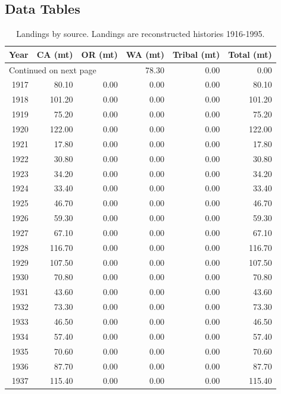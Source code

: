 \documentclass[12pt,]{article}
\begin{document}
\hypertarget{data-tables}{%
\subsection{Data Tables}\label{data-tables}}

\begin{longtable}{rrrrrr}
\caption{Landings by source.  Landings are reconstructed histories 1916-1995.} \\ 
  \hline
Year & CA (mt) & OR (mt) & WA (mt) & Tribal (mt) & Total (mt) \\ 
  \hline 
\endhead 
\hline 
\multicolumn{3}{l}{\footnotesize Continued on next page} 
\endfoot 
\endlastfoot 
 \hline
1916 & 78.30 & 0.00 & 0.00 & 0.00 & 78.30 \\ 
  1917 & 80.10 & 0.00 & 0.00 & 0.00 & 80.10 \\ 
  1918 & 101.20 & 0.00 & 0.00 & 0.00 & 101.20 \\ 
  1919 & 75.20 & 0.00 & 0.00 & 0.00 & 75.20 \\ 
  1920 & 122.00 & 0.00 & 0.00 & 0.00 & 122.00 \\ 
  1921 & 17.80 & 0.00 & 0.00 & 0.00 & 17.80 \\ 
  1922 & 30.80 & 0.00 & 0.00 & 0.00 & 30.80 \\ 
  1923 & 34.20 & 0.00 & 0.00 & 0.00 & 34.20 \\ 
  1924 & 33.40 & 0.00 & 0.00 & 0.00 & 33.40 \\ 
  1925 & 46.70 & 0.00 & 0.00 & 0.00 & 46.70 \\ 
  1926 & 59.30 & 0.00 & 0.00 & 0.00 & 59.30 \\ 
  1927 & 67.10 & 0.00 & 0.00 & 0.00 & 67.10 \\ 
  1928 & 116.70 & 0.00 & 0.00 & 0.00 & 116.70 \\ 
  1929 & 107.50 & 0.00 & 0.00 & 0.00 & 107.50 \\ 
  1930 & 70.80 & 0.00 & 0.00 & 0.00 & 70.80 \\ 
  1931 & 43.60 & 0.00 & 0.00 & 0.00 & 43.60 \\ 
  1932 & 73.30 & 0.00 & 0.00 & 0.00 & 73.30 \\ 
  1933 & 46.50 & 0.00 & 0.00 & 0.00 & 46.50 \\ 
  1934 & 57.40 & 0.00 & 0.00 & 0.00 & 57.40 \\ 
  1935 & 70.60 & 0.00 & 0.00 & 0.00 & 70.60 \\ 
  1936 & 87.70 & 0.00 & 0.00 & 0.00 & 87.70 \\ 
  1937 & 115.40 & 0.00 & 0.00 & 0.00 & 115.40 \\ 

\end{longtable}
\end{document}
